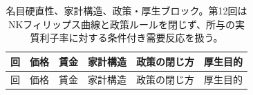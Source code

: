 \documentclass[
  japanese,
  lualatex,
  ja=standard,
  12pt,
  a4paper]{ltjsarticle}
\begin{document}
\begin{longtable}[]{@{}
  >{\raggedleft\arraybackslash}p{}
  >{\raggedright\arraybackslash}p{}
  >{\raggedright\arraybackslash}p{}
  >{\raggedright\arraybackslash}p{}
  >{\raggedright\arraybackslash}p{}
  >{\raggedright\arraybackslash}p{}@{}}
\caption{名目硬直性、家計構造、政策・厚生ブロック。第12回はNKフィリップス曲線と政策ルールを閉じず、所与の実質利子率に対する条件付き需要反応を扱う。}\label{tbl-assumption-nominal}\tabularnewline
\toprule\noalign{}
\begin{minipage}[b]{\linewidth}\raggedleft
回
\end{minipage} & \begin{minipage}[b]{\linewidth}\raggedright
価格
\end{minipage} & \begin{minipage}[b]{\linewidth}\raggedright
賃金
\end{minipage} & \begin{minipage}[b]{\linewidth}\raggedright
家計構造
\end{minipage} & \begin{minipage}[b]{\linewidth}\raggedright
政策の閉じ方
\end{minipage} & \begin{minipage}[b]{\linewidth}\raggedright
厚生目的
\end{minipage} \\
\midrule\noalign{}
\endfirsthead
\toprule\noalign{}
\begin{minipage}[b]{\linewidth}\raggedleft
回
\end{minipage} & \begin{minipage}[b]{\linewidth}\raggedright
価格
\end{minipage} & \begin{minipage}[b]{\linewidth}\raggedright
賃金
\end{minipage} & \begin{minipage}[b]{\linewidth}\raggedright
家計構造
\end{minipage} & \begin{minipage}[b]{\linewidth}\raggedright
政策の閉じ方
\end{minipage} & \begin{minipage}[b]{\linewidth}\raggedright
厚生目的
\end{minipage} \\

\end{longtable}
\end{document}
